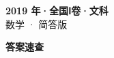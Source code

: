\documentclass[zihao=-4, a4paper]{ctexart}
\begin{document}
\begin{center}
  {\Large\bfseries 2019 年·全国Ⅰ卷·文科}\\[4pt]
  {\large 数学 · 简答版}
\end{center}
\medskip
{}

\clearpage
{}
\begin{center}{\Large\bfseries 答案速查}\end{center}
\medskip

\end{document}
